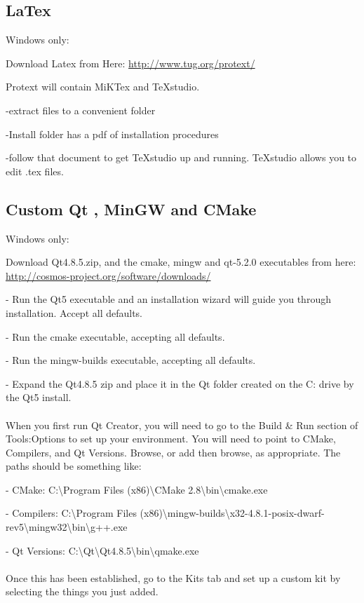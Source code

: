 \subsection{LaTex}
Windows only:

Download Latex from Here: \url{http://www.tug.org/protext/}

Protext will contain MiKTex and TeXstudio.

-extract files to a convenient folder

-Install folder has a pdf of installation procedures

-follow that document to get TeXstudio up and running. TeXstudio allows you to edit .tex files.

\subsection{Custom Qt , MinGW and CMake}
Windows only:

Download Qt4.8.5.zip, and the cmake, mingw and qt-5.2.0 executables from here: \url{http://cosmos-project.org/software/downloads/}

- Run the Qt5 executable and an installation wizard will guide you through installation. Accept all defaults.

- Run the cmake executable, accepting all defaults.

- Run the mingw-builds executable, accepting all defaults.

- Expand the Qt4.8.5 zip and place it in the Qt folder created on the C: drive by the Qt5 install.
\\
\\
When you first run Qt Creator, you will need to go to the Build \& Run section of Tools:Options to set up your environment. You will need to point to CMake, Compilers, and Qt Versions. Browse, or add then browse, as appropriate. The paths should be something like:

- CMake: C:\textbackslash Program Files (x86)\textbackslash CMake 2.8\textbackslash bin\textbackslash cmake.exe

- Compilers: C:\textbackslash Program Files (x86)\textbackslash mingw-builds\textbackslash x32-4.8.1-posix-dwarf-rev5\textbackslash mingw32\textbackslash bin\textbackslash g++.exe

- Qt Versions: C:\textbackslash Qt\textbackslash Qt4.8.5\textbackslash bin\textbackslash qmake.exe
\\
\\
Once this has been established, go to the Kits tab and set up a custom kit by selecting the things you just added.







